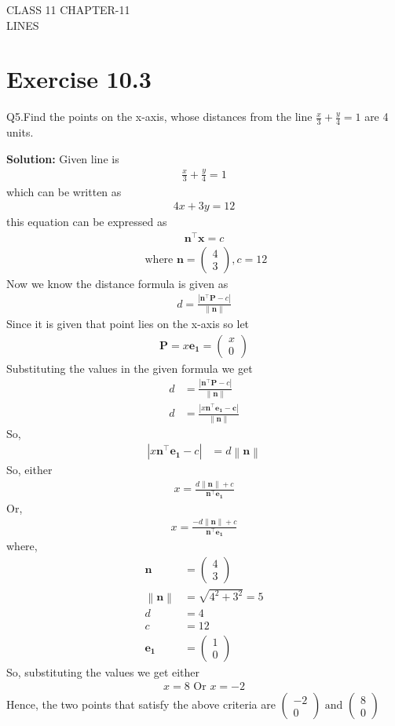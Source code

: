 \documentclass[12pt]{article}
\providecommand{\norm}[1]{\left\lVert#1\right\rVert}
\newcommand{\solution}{\noindent \textbf{Solution: }}
\newcommand{\myvec}[1]{\ensuremath{\begin{pmatrix}#1\end{pmatrix}}}
\providecommand{\abs}[1]{\left\vert#1\right\vert}
\let\vec\mathbf
\begin{document}
\begin{center}
\textbf\large{CLASS 11 CHAPTER-11 \\ LINES}

\end{center}
\section*{Exercise 10.3}

Q5.Find the points on the x-axis, whose distances from the line $\frac{x}{3}+\frac{y}{4}=1$ are 4 units.

\solution
Given line is 
\begin{align}
	\frac{x}{3}+\frac{y}{4}=1
\end{align}
which can be written as
\begin{align}
	4x+3y=12
\end{align}
this equation can be expressed as 
\begin{align}
	\vec{n}^{\top}\vec{x}=c
\end{align}
\begin{align}
	\text{ where }
		\vec{n} = \myvec{4\\3} , c = 12
\end{align}
Now we know the distance formula is given as
\begin{align}
	d = \frac{\abs{\vec{n}^\top\vec{P}-c}}{\norm{\vec{n}}}
\end{align}
Since it is given that point lies on the x-axis so let
\begin{align}
	\vec{P} = x\vec{e_{1}} = \myvec{x\\0}
\end{align}
Substituting the values in the given formula we get
\begin{align}
	d &= \frac{\abs{\vec{n}^\top\vec{P}-c}}{\norm{\vec{n}}}\\
	d &= \frac{\abs{x\vec{n}^\top\vec{e_{1}-c}}}{\norm{\vec{n}}}
\end{align}
So,
\begin{align}
	\abs{x\vec{n}^\top\vec{e_{1}}-c} &= d\norm{\vec{n}}
\end{align}
So, either
\begin{align}
	x = \frac{d\norm{\vec{n}}+c}{\vec{n}^\top\vec{e_{1}}}
\end{align}
Or,
\begin{align}
	x = \frac{-d\norm{\vec{n}}+c}{\vec{n}^\top\vec{e_{1}}}
\end{align}
where,
\begin{align}
	\vec{n} &= \myvec{4\\3}\\
	\norm{\vec{n}} &= \sqrt{4^2+3^2} = 5\\
	d &= 4\\
	c &= 12\\
	\vec{e_{1}} &= \myvec{1\\0}
\end{align}
So, substituting the values we get either
\begin{align}
	x = 8
	\text{ Or }
	x = -2
\end{align}
Hence, the two points that satisfy the above criteria are $\myvec{-2\\0} \text{ and } \myvec{8\\0}$	
\end{document}
